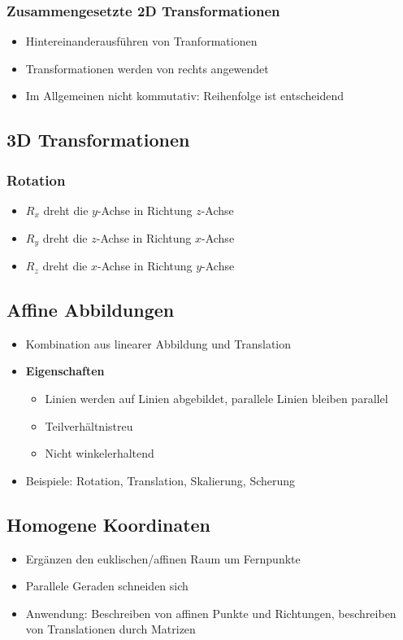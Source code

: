 \subsubsection{Zusammengesetzte 2D Transformationen}
\begin{itemize}
	\item Hintereinanderausführen von Tranformationen
	\item Transformationen werden von rechts angewendet
	\item Im Allgemeinen nicht kommutativ: Reihenfolge ist entscheidend
\end{itemize}


\subsection{3D Transformationen}

\subsubsection{Rotation}
\begin{itemize}
	\item \(R_x\) dreht die \(y\)-Achse in Richtung \(z\)-Achse
	\item \(R_y\) dreht die \(z\)-Achse in Richtung \(x\)-Achse
	\item \(R_z\) dreht die \(x\)-Achse in Richtung \(y\)-Achse
\end{itemize}


\subsection{Affine Abbildungen}
\begin{itemize}
	\item Kombination aus linearer Abbildung und Translation
	\item \textbf{Eigenschaften}
	\begin{itemize}
		\item Linien werden auf Linien abgebildet, parallele Linien bleiben parallel
		\item Teilverhältnistreu
		\item Nicht winkelerhaltend
	\end{itemize}
	\item Beispiele: Rotation, Translation, Skalierung, Scherung
\end{itemize}


\subsection{Homogene Koordinaten}
\begin{itemize}
	\item Ergänzen den euklischen/affinen Raum um Fernpunkte
	\item Parallele Geraden schneiden sich
	\item Anwendung: Beschreiben von affinen Punkte und Richtungen, beschreiben von Translationen durch Matrizen
\end{itemize}

